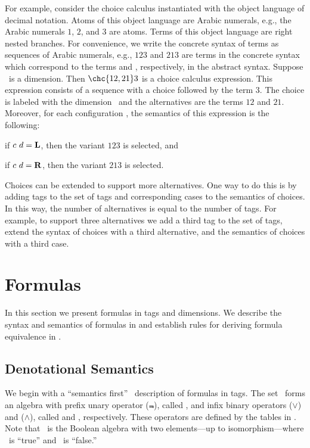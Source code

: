 For example, consider the choice calculus instantiated with the object language of decimal notation.
Atoms of this object language are Arabic numerals, e.g., the Arabic numerals $1$, $2$, and $3$ are atoms.
Terms of this object language are right nested branches.
For convenience, we write the concrete syntax of terms as sequences of Arabic numerals, e.g., $123$ and $213$ are terms in the concrete syntax which correspond to the terms \tr[1]{\objEmpty, \tr[2]{\objEmpty, \tr[3]{\objEmpty, \objEmpty}}} and \tr[2]{\objEmpty, \tr[1]{\objEmpty, \tr[3]{\objEmpty, \objEmpty}}}, respectively, in the abstract syntax.
Suppose \dE\ is a dimension.
Then $\chc{12,21}3$ is a choice calculus expression.
This expression consists of a sequence with a choice followed by the term $3$.
The choice is labeled with the dimension \dE\ and the alternatives are the terms $12$ and $21$.
Moreover, for each configuration \cE, the semantics of this expression is the following:
%
\begin{inparaenum}[(1)]
  \item if $\color{black}c\ \color{black}d = \color{black}\mathbf{L}$, then the variant $123$ is selected, and
  \item if $\color{black}c\ \color{black}d = \color{black}\mathbf{R}$, then the variant $213$ is selected.
\end{inparaenum}

Choices can be extended to support more alternatives.
One way to do this is by adding tags to the set of tags and corresponding cases to the semantics of choices.
In this way, the number of alternatives is equal to the number of tags.
For example, to support three alternatives we add a third tag to the set of tags, extend the syntax of choices with a third alternative, and the semantics of choices with a third case.

\section{Formulas}
\label{sec:f}

In this section we present formulas in tags and dimensions.
We describe the syntax and semantics of formulas in  and establish rules for deriving formula equivalence in .

\subsection{Denotational Semantics}
\label{sec:fsem}

We begin with a ``semantics first''~\citep{EW11sle} description of formulas in tags.
The set \tagS\ forms an algebra with prefix unary operator ($\Not$), called , and infix binary operators ($\lor$) and ($\land$), called  and , respectively.
These operators are defined by the tables in .
Note that \tagS\ is the Boolean algebra with two elements---up to isomorphism---where \tagL\ is ``true'' and \tagR\ is ``false.''

